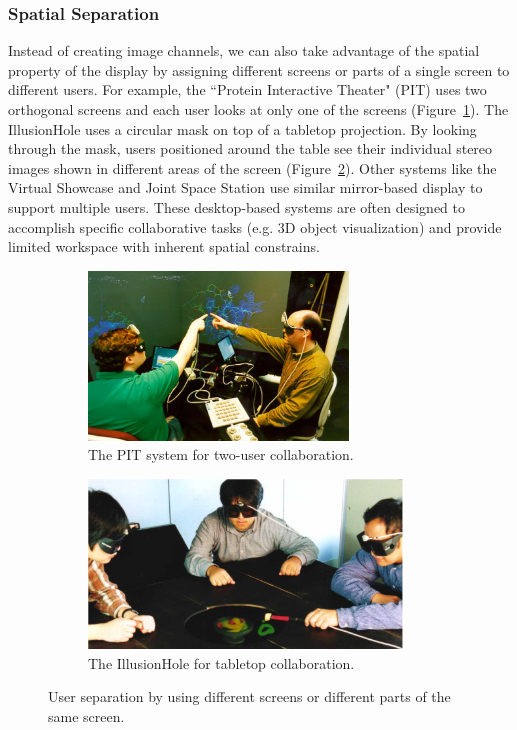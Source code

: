 \subsubsection{Spatial Separation}
Instead of creating image channels, we can also take advantage of the spatial property of the display by assigning different screens or parts of a single screen to different users. For example, the ``Protein Interactive Theater" (PIT) \citep{Arthur1998PIT} uses two orthogonal screens and each user looks at only one of the screens (Figure~\ref{fig:2_sep_spatial:pit}). The IllusionHole \citep{Kitamura2001Interactive} uses a circular mask on top of a tabletop projection. By looking through the mask, users positioned around the table see their individual stereo images shown in different areas of the screen (Figure~\ref{fig:2_sep_spatial:illu}). Other systems like the Virtual Showcase \citep{Bimber2006Virtual} and Joint Space Station \citep{Mulder2004Modular} use similar mirror-based display to support multiple users. These desktop-based systems are often designed to accomplish specific collaborative tasks (e.g. 3D object visualization) and provide limited workspace with inherent spatial constrains. 

\begin{figure}[htb]
  \begin{subfigure}{.45\textwidth}
    \centering
    \includegraphics[height=4.5cm]{figures/ch2/pit}
    \caption{The PIT system for two-user collaboration.}
    \label{fig:2_sep_spatial:pit}
  \end{subfigure}
  \begin{subfigure}{.55\textwidth}
    \centering
    \includegraphics[height=4.5cm]{figures/ch2/illusionHole}
    \caption{The IllusionHole for tabletop collaboration.}
    \label{fig:2_sep_spatial:illu}
  \end{subfigure}
  \caption{\label{fig:2_sep_spatial}User separation by using different screens or different parts of the same screen.}
\end{figure}

